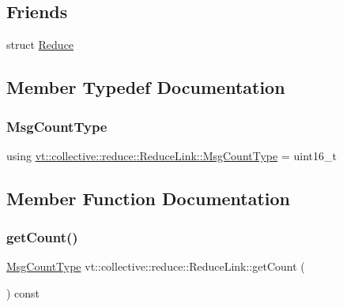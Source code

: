 \subsection*{Friends}
\begin{DoxyCompactItemize}
\item 
struct \hyperlink{structvt_1_1collective_1_1reduce_1_1_reduce_link_a46b0fc47c92fae92b73cff2d9b4c1242}{Reduce}
\end{DoxyCompactItemize}


\subsection{Member Typedef Documentation}
\mbox{\label{structvt_1_1collective_1_1reduce_1_1_reduce_link_a041d928748b444f18ea3ddb72fdbe08a}} 
\subsubsection{\texorpdfstring{Msg\+Count\+Type}{MsgCountType}}
{\footnotesize\ttfamily using \hyperlink{structvt_1_1collective_1_1reduce_1_1_reduce_link_a041d928748b444f18ea3ddb72fdbe08a}{vt\+::collective\+::reduce\+::\+Reduce\+Link\+::\+Msg\+Count\+Type} =  uint16\+\_\+t}



\subsection{Member Function Documentation}
\mbox{\label{structvt_1_1collective_1_1reduce_1_1_reduce_link_ad182794660d06139bbc59f85151cb27b}} 
\subsubsection{\texorpdfstring{get\+Count()}{getCount()}}
{\footnotesize\ttfamily \hyperlink{structvt_1_1collective_1_1reduce_1_1_reduce_link_a041d928748b444f18ea3ddb72fdbe08a}{Msg\+Count\+Type} vt\+::collective\+::reduce\+::\+Reduce\+Link\+::get\+Count (\begin{DoxyParamCaption}{ }\end{DoxyParamCaption}) const\hspace{0.3cm}{\ttfamily [inline]}}

